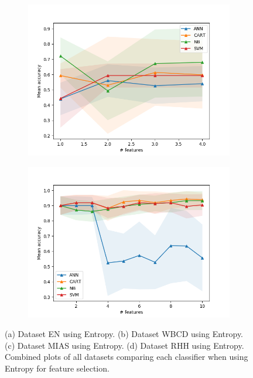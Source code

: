 \begin{figure}[htbp]
  \begin{subfigure}[b]{0.475\textwidth}
      \centering
      \includegraphics[width=\textwidth]{../plots_with_std_fill/Data_mias_entropy_combined.png}
      \caption[]%
      {{\small }}
      \label{fig:MIAS_entropy}
  \end{subfigure}
  \quad
  \begin{subfigure}[b]{0.475\textwidth}
      \centering
      \includegraphics[width=\textwidth]{../plots_with_std_fill/FNA_gb_entropy_combined.png}
      \caption[]%
      {{\small }}
      \label{fig:RHH_entropy}
  \end{subfigure}
  \caption[]
  {{\small (a) Dataset EN using Entropy. (b) Dataset WBCD using Entropy. (c) Dataset MIAS using Entropy. (d) Dataset RHH using Entropy. Combined plots of all datasets comparing each classifier when using Entropy for feature selection.}}
  \label{fig:plots_entropy}
\end{figure}
